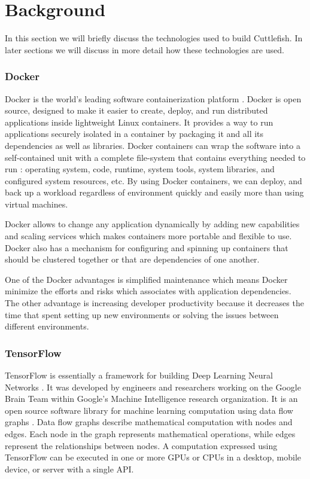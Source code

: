 \documentclass[conference]{IEEEtran}
\begin{document}
\section{Background}
In this section we will briefly discuss the technologies used to build Cuttlefish. In later sections we will discuss in more detail how these technologies are used.\\

\subsubsection{Docker}
Docker is the world's leading software containerization platform \cite{what-docker}. Docker is open source, designed to make it easier to create, deploy, and run distributed applications inside lightweight Linux containers. It provides a way to run applications securely isolated in a container by packaging it and all its dependencies as well as libraries. Docker containers can wrap the software into a self-contained unit with a complete file-system that contains everything needed to run \cite{ben-use-docker}: operating system, code, runtime, system tools, system libraries, and configured system resources, etc. By using Docker containers, we can deploy, and back up a workload regardless of environment quickly and easily more than using virtual machines.

Docker allows to change any application dynamically by adding new capabilities and scaling services which makes containers more portable and flexible to use. Docker also has a mechanism for configuring and spinning up containers that should be clustered together or that are dependencies of one another.

One of the Docker advantages is simplified maintenance which means Docker minimize the efforts and risks which associates with application dependencies. The other advantage is increasing developer productivity because it decreases the time that spent setting up new environments or solving the issues between different environments.

\subsubsection{TensorFlow}
TensorFlow is essentially a framework for building Deep Learning Neural Networks \cite{tensor-home}. It was developed by engineers and researchers working on the Google Brain Team within Google's Machine Intelligence research organization. It is an open source software library for machine learning computation using data flow graphs \cite{tensor-home}. Data flow graphs describe mathematical computation with nodes and edges. Each node in the graph represents mathematical operations, while edges represent the relationships between nodes. A computation expressed using TensorFlow can be executed in one or more GPUs or CPUs in a desktop, mobile device, or server with a single API.
\end{document}
